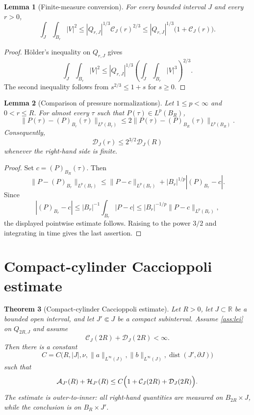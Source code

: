 \documentclass[11pt]{amsart}
\theoremstyle{plain}
\newtheorem{theorem}{Theorem}[section]
\newtheorem{lemma}[theorem]{Lemma}
\theoremstyle{definition}
\theoremstyle{remark}
\begin{document}
\begin{lemma}[Finite-measure conversion]\label{lem:l2-from-l3}
For every bounded interval $J$ and every $r>0$,
\[
\int_J\!\int_{B_r}|V|^2
\le |Q_{r,J}|^{1/3}\mathcal C_J(r)^{2/3}
\le |Q_{r,J}|^{1/3}\bigl(1+\mathcal C_J(r)\bigr).
\]
\end{lemma}

\begin{proof}
H\"older's inequality on $Q_{r,J}$ gives
\[
\int_J\!\int_{B_r}|V|^2
\le |Q_{r,J}|^{1/3}\left(\int_J\!\int_{B_r}|V|^3\right)^{2/3}.
\]
The second inequality follows from $s^{2/3}\le 1+s$ for $s\ge0$.
\end{proof}

\begin{lemma}[Comparison of pressure normalizations]\label{lem:pressure-means}
Let $1\le p<\infty$ and $0<r\le R$. For almost every $\tau$ such that
$P(\tau)\in L^p(B_R)$,
\[
\|P(\tau)-(P)_{B_r}(\tau)\|_{L^p(B_r)}
\le 2\|P(\tau)-(P)_{B_R}(\tau)\|_{L^p(B_R)}.
\]
Consequently,
\[
\mathcal D_J(r)\le 2^{3/2}\mathcal D_J(R)
\]
whenever the right-hand side is finite.
\end{lemma}

\begin{proof}
Set $c=(P)_{B_R}(\tau)$. Then
\[
\|P-(P)_{B_r}\|_{L^p(B_r)}
\le \|P-c\|_{L^p(B_r)}+|B_r|^{1/p}|(P)_{B_r}-c|.
\]
Since
\[
|(P)_{B_r}-c|\le |B_r|^{-1}\int_{B_r}|P-c|
\le |B_r|^{-1/p}\|P-c\|_{L^p(B_r)},
\]
the displayed pointwise estimate follows. Raising to the power $3/2$ and
integrating in time gives the last assertion.
\end{proof}

\section{Compact-cylinder Caccioppoli estimate}

\begin{theorem}[Compact-cylinder Caccioppoli estimate]\label{thm:caccioppoli}
Let $R>0$, let $J\subset\mathbb R$ be a bounded open interval, and let
$J'\Subset J$ be a compact subinterval. Assume
\cref{ass:lei} on $Q_{2R,J}$ and assume
\[
\mathcal C_J(2R)+\mathcal D_J(2R)<\infty.
\]
Then there is a constant
\[
C=C\bigl(R,|J|,\nu,\|a\|_{L^\infty(J)},\|b\|_{L^\infty(J)},
\operatorname{dist}(J',\partial J)\bigr)
\]
such that
\[
\mathcal A_{J'}(R)+\mathcal H_{J'}(R)
\le C\Bigl(1+
\mathcal C_J(2R)+\mathcal D_J(2R)
\Bigr).
\]
The estimate is outer-to-inner: all right-hand quantities are measured on
$B_{2R}\times J$, while the conclusion is on $B_R\times J'$.
\end{theorem}
\end{document}
